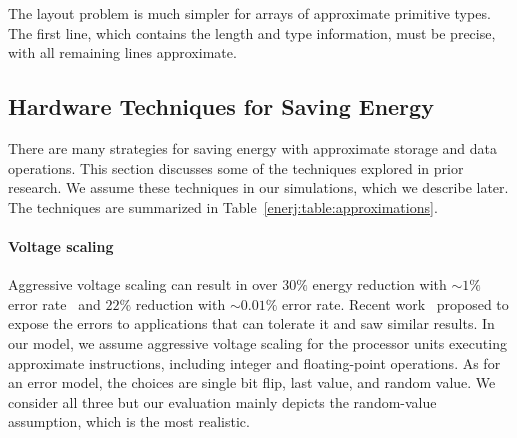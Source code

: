 The layout problem is much simpler for arrays of approximate primitive
types. The first line, which
contains the length and type information, must be precise, with all remaining
lines approximate.


\subsection{Hardware Techniques for Saving Energy }
\label{enerj:strategies}





There are many strategies for saving energy with approximate
storage and data operations. This section discusses some of the
techniques explored in prior research. We assume these techniques in
our simulations, which we describe later. The techniques are summarized
in Table~\ref{enerj:table:approximations}.


\paragraph{Voltage scaling} Aggressive voltage
scaling can result in over $30\%$ energy reduction with
$\sim \! 1\%$ error rate~\cite{razor} and $22\%$ reduction with
$\sim \! 0.01\%$ error rate.  Recent work~\cite{hpca10cam,relax} proposed to
expose the errors to applications that can tolerate it and saw similar
results. In our model, we assume aggressive voltage scaling for the
processor units executing approximate instructions,
including integer and floating-point operations. As for an
error model, the choices are single bit flip, last value, and random
value. We consider all three but our evaluation mainly depicts the
random-value assumption, which is the most realistic.

